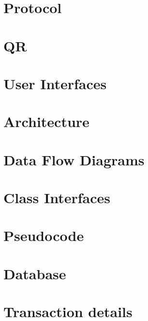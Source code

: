 \chapter{Protocol}


\chapter{QR}


\chapter{User Interfaces}


\chapter{Architecture}


\chapter{Data Flow Diagrams}


\chapter{Class Interfaces}


\chapter{Pseudocode}


\chapter{Database}


\chapter{Transaction details}

